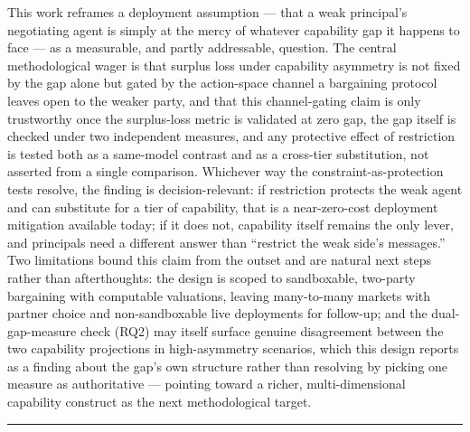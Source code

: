 \documentclass[11pt]{article}
\begin{document}
This work reframes a deployment assumption --- that a weak principal's negotiating agent is simply at the mercy of whatever capability gap it happens to face --- as a measurable, and partly addressable, question. The central methodological wager is that surplus loss under capability asymmetry is not fixed by the gap alone but gated by the action-space channel a bargaining protocol leaves open to the weaker party, and that this channel-gating claim is only trustworthy once the surplus-loss metric is validated at zero gap, the gap itself is checked under two independent measures, and any protective effect of restriction is tested both as a same-model contrast and as a cross-tier substitution, not asserted from a single comparison. Whichever way the constraint-as-protection tests resolve, the finding is decision-relevant: if restriction protects the weak agent and can substitute for a tier of capability, that is a near-zero-cost deployment mitigation available today; if it does not, capability itself remains the only lever, and principals need a different answer than ``restrict the weak side's messages.'' Two limitations bound this claim from the outset and are natural next steps rather than afterthoughts: the design is scoped to sandboxable, two-party bargaining with computable valuations, leaving many-to-many markets with partner choice and non-sandboxable live deployments for follow-up; and the dual-gap-measure check (RQ2) may itself surface genuine disagreement between the two capability projections in high-asymmetry scenarios, which this design reports as a finding about the gap's own structure rather than resolving by picking one measure as authoritative --- pointing toward a richer, multi-dimensional capability construct as the next methodological target.

\vspace{1em}
\hrule
\vspace{1em}
\end{document}
